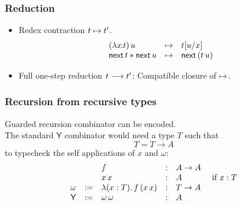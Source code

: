 \documentclass[t]{beamer}
\newcommand{\nex}{\tnext\,}
\newcommand{\Y}{\mathsf{Y}}
\newcommand{\muT}[2]{\mu {#1} \hspace{-0.1em} . \,  {#2}}
\begin{document}
\begin{frame}%
  \frametitle{Reduction}
  \begin{itemize}
  \item Redex contraction $t \mapsto t'$.
\[
\begin{array}{lcl}
  (\lam x t)\, u & \contr & \subst u x t \\
  \nex t \ast \nex u & \contr & \nex (t\,u) \\
\end{array}
\]
  \item Full one-step reduction $t \longrightarrow t'$: Compatible closure of $\mapsto$.
  \end{itemize}
\end{frame}


\begin{frame}%
  \frametitle{Recursion from recursive types}
Guarded recursion combinator can be encoded. \\
The standard $\Y$ combinator would need a type $T$ such that
\[ T = T \to A \]
to typecheck the self applications of $x$ and $\omega$:\\
\[
\begin{array}{lllllll}
  &&f & : & A \to A \\
  &&x\,x & : & A & \mif x : T \\
  \omega & := & \lambda (x : T). \, f\,(x \, x) & : & T \to A \\
  \Y     & := & \omega \, \omega & : & A \\
\end{array}
\]
\end{frame}
\end{document}
